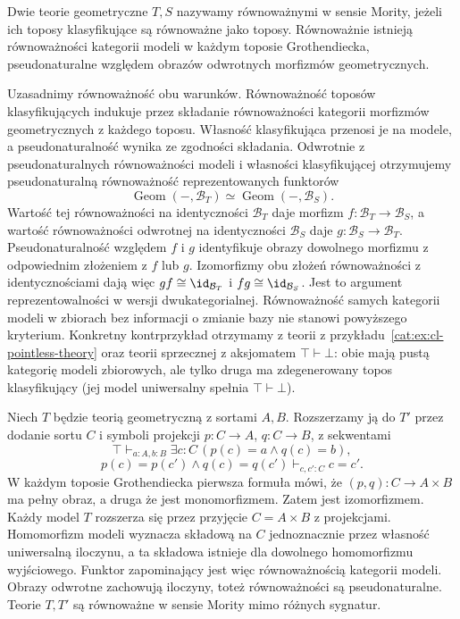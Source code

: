 \begin{definicja}\label{cat:def:cl-morita}
Dwie teorie geometryczne $T,S$ nazywamy równoważnymi w sensie Mority, jeżeli ich toposy klasyfikujące są równoważne jako toposy. Równoważnie istnieją równoważności kategorii modeli w każdym toposie Grothendiecka, pseudonaturalne względem obrazów odwrotnych morfizmów geometrycznych.
\end{definicja}

Uzasadnimy równoważność obu warunków. Równoważność toposów klasyfikujących indukuje przez składanie równoważności kategorii morfizmów geometrycznych z każdego toposu. Własność klasyfikująca przenosi je na modele, a pseudonaturalność wynika ze zgodności składania. Odwrotnie z pseudonaturalnych równoważności modeli i własności klasyfikującej otrzymujemy pseudonaturalną równoważność reprezentowanych funktorów
\[
 \operatorname{Geom}(-,\mathcal B_T)\simeq
 \operatorname{Geom}(-,\mathcal B_S).
\]
Wartość tej równoważności na identyczności $\mathcal B_T$ daje morfizm $f:\mathcal B_T\to\mathcal B_S$, a wartość równoważności odwrotnej na identyczności $\mathcal B_S$ daje $g:\mathcal B_S\to\mathcal B_T$. Pseudonaturalność względem $f$ i $g$ identyfikuje obrazy dowolnego morfizmu z odpowiednim złożeniem z $f$ lub $g$. Izomorfizmy obu złożeń równoważności z identycznościami dają więc $gf\cong\id_{\mathcal B_T}$ i $fg\cong\id_{\mathcal B_S}$. Jest to argument reprezentowalności w wersji dwukategorialnej. Równoważność samych kategorii modeli w zbiorach bez informacji o zmianie bazy nie stanowi powyższego kryterium. Konkretny kontrprzykład otrzymamy z teorii z przykładu~\ref{cat:ex:cl-pointless-theory} oraz teorii sprzecznej z aksjomatem $\top\vdash\bot$: obie mają pustą kategorię modeli zbiorowych, ale tylko druga ma zdegenerowany topos klasyfikujący (jej model uniwersalny spełnia $\top\vdash\bot$).

\begin{przyklad}\label{cat:ex:cl-morita-product}
Niech $T$ będzie teorią geometryczną z sortami $A,B$. Rozszerzamy ją do $T'$ przez dodanie sortu $C$ i symboli projekcji $p:C\to A$, $q:C\to B$, z sekwentami
\[
 \top\vdash_{a:A,b:B}\exists c:C\,(p(c)=a\wedge q(c)=b),
\]
\[
 p(c)=p(c')\wedge q(c)=q(c')\vdash_{c,c':C}c=c'.
\]
W każdym toposie Grothendiecka pierwsza formuła mówi, że $(p,q):C\to A\times B$ ma pełny obraz, a druga że jest monomorfizmem. Zatem jest izomorfizmem. Każdy model $T$ rozszerza się przez przyjęcie $C=A\times B$ z projekcjami. Homomorfizm modeli wyznacza składową na $C$ jednoznacznie przez własność uniwersalną iloczynu, a ta składowa istnieje dla dowolnego homomorfizmu wyjściowego. Funktor zapominający jest więc równoważnością kategorii modeli. Obrazy odwrotne zachowują iloczyny, toteż równoważności są pseudonaturalne. Teorie $T,T'$ są równoważne w sensie Mority mimo różnych sygnatur.
\end{przyklad}

